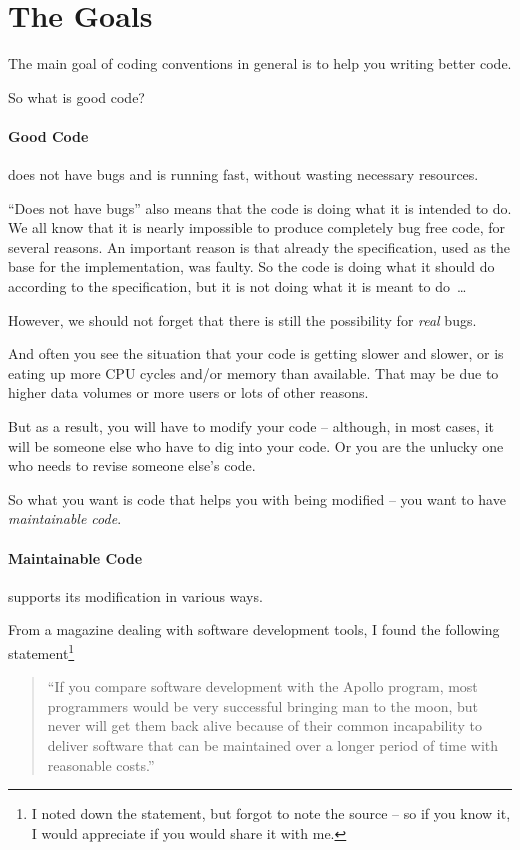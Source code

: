\documentclass[11pt,a4paper, titlepage, parskip=half, headsepline, footsepline, cleardoublepage=current, headheight=1cm]{scrbook}
\begin{document}
\section{The Goals}
The main goal of coding conventions in general is to help you writing better code.

So what is good code?

\paragraph{Good Code} does not have bugs and is running fast, without wasting necessary resources.

“Does not have bugs” also means that the code is doing what it is intended to do. We all know that it is nearly impossible to produce completely bug free code, for several reasons. An important reason is that already the specification, used as the base for the implementation, was faulty. So the code is doing what it should do according to the specification, but it is not doing what it is meant to do~…

However, we should not forget that there is still the possibility for \textit{real} bugs.

And often you see the situation that your code is getting slower and slower, or is eating up more CPU cycles and/or memory than available. That may be due to higher data volumes or more users or lots of other reasons.

But as a result, you will have to modify your code – although, in most cases, it will be someone else who have to dig into your code. Or you are the unlucky one who needs to revise someone else's code.

So what you want is code that helps you with being modified – you want to have \textit{maintainable code}.

\paragraph{Maintainable Code} supports its modification in various ways.

From a magazine dealing with software development tools, I found the following statement\footnote{I noted down the statement, but forgot to note the source – so if you know it, I would appreciate if you would share it with me.}

\begin{quotation}
“If you compare software development with the Apollo program, most programmers would be very successful bringing man to the moon, but never will get them back alive because of their common incapability to deliver software that can be maintained over a longer period of time with reasonable costs.” \\
\autocite{UnknownSource1}
\end{quotation}
\end{document}
